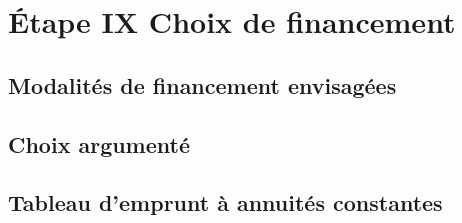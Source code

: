 \section{Étape IX \textendash{} Choix de financement}

\subsection{Modalités de financement envisagées}
\subsection{Choix argumenté}
\subsection{Tableau d'emprunt à annuités constantes}
